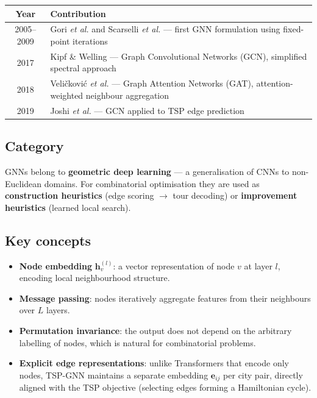 \documentclass[12pt,a4paper]{article}
\begin{document}
\begin{center}
\begin{tabularx}{\linewidth}{cX}
\toprule
\textbf{Year} & \textbf{Contribution} \\
\midrule
2005--2009 & Gori \textit{et al.} and Scarselli \textit{et al.} ---
             first GNN formulation using fixed-point iterations \\
2017 & Kipf \& Welling --- Graph Convolutional Networks (GCN),
       simplified spectral approach \\
2018 & Veli\v{c}kovi\'{c} \textit{et al.} --- Graph Attention Networks (GAT),
       attention-weighted neighbour aggregation \\
2019 & Joshi \textit{et al.} --- GCN applied to TSP edge prediction \\
\bottomrule
\end{tabularx}
\end{center}

\subsection*{Category}

GNNs belong to \textbf{geometric deep learning} --- a generalisation of CNNs
to non-Euclidean domains.
For combinatorial optimisation they are used as \textbf{construction heuristics}
(edge scoring $\to$ tour decoding) or \textbf{improvement heuristics}
(learned local search).

\subsection*{Key concepts}

\begin{itemize}[leftmargin=1.5em]
  \item \textbf{Node embedding} $\mathbf{h}_v^{(l)}$: a vector representation of
    node $v$ at layer $l$, encoding local neighbourhood structure.
  \item \textbf{Message passing}: nodes iteratively aggregate features from their
    neighbours over $L$ layers.
  \item \textbf{Permutation invariance}: the output does not depend on the
    arbitrary labelling of nodes, which is natural for combinatorial problems.
  \item \textbf{Explicit edge representations}: unlike Transformers that encode
    only nodes, TSP-GNN maintains a separate embedding $\mathbf{e}_{ij}$ per
    city pair, directly aligned with the TSP objective (selecting edges forming
    a Hamiltonian cycle).
\end{itemize}
\end{document}
